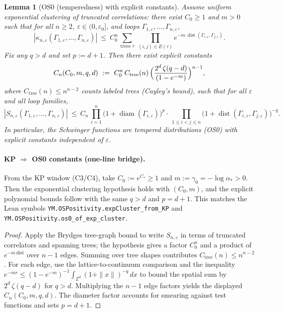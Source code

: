 \documentclass[11pt]{amsart}
\theoremstyle{plain}
\newtheorem{lemma}[theorem]{Lemma}
\theoremstyle{definition}
\theoremstyle{remark}
\newcommand{\leanref}[1]{\nolinkurl{#1}}
\begin{document}
\begin{lemma}[OS0 (temperedness) with explicit constants]
Assume uniform exponential clustering of truncated correlations: there exist $C_0\ge 1$ and $m>0$ such that for all $n\ge 2$, $\varepsilon\in(0,\varepsilon_0]$, and loops $\Gamma_{1,\varepsilon},\dots,\Gamma_{n,\varepsilon}$,
\[
  |\kappa_{n,\varepsilon}(\Gamma_{1,\varepsilon},\dots,\Gamma_{n,\varepsilon})|
   \ \le\ C_0^n\,\sum_{\text{trees }\tau}\ \prod_{(i,j)\in E(\tau)} e^{-m\,\operatorname{dist}(\Gamma_{i,\varepsilon},\Gamma_{j,\varepsilon})}.
\]
Fix any $q>d$ and set $p:=d+1$. Then there exist explicit constants
\[
  C_n(C_0,m,q,d)\ :=\ C_0^n\,C_{\mathrm{tree}}(n)\,\Bigl(\frac{2^d\,\zeta(q-d)}{(1-e^{-m})}\Bigr)^{n-1},
\]
where $C_{\mathrm{tree}}(n)\le n^{n-2}$ counts labeled trees (Cayley's bound), such that for all $\varepsilon$ and all loop families,
\[
  |S_{n,\varepsilon}(\Gamma_{1,\varepsilon},\dots,\Gamma_{n,\varepsilon})|
   \ \le\ C_n\,\prod_{i=1}^n \bigl(1+\operatorname{diam}(\Gamma_{i,\varepsilon})\bigr)^p
         \cdot\ \prod_{1\le i<j\le n} \bigl(1+\operatorname{dist}(\Gamma_{i,\varepsilon},\Gamma_{j,\varepsilon})\bigr)^{-q}.
\]
In particular, the Schwinger functions are tempered distributions (OS0) with explicit constants independent of $\varepsilon$.
\end{lemma}

\paragraph{KP $\Rightarrow$ OS0 constants (one-line bridge).}
From the KP window (C3/C4), take $C_0:=e^{C_*}\ge 1$ and $m:=\gamma_0=-\log\alpha_*>0$. Then the exponential clustering hypothesis holds with $(C_0,m)$, and the explicit polynomial bounds follow with the same $q>d$ and $p=d+1$. This matches the Lean symbols \leanref{YM.OSPositivity.expCluster_from_KP} and \leanref{YM.OSPositivity.os0_of_exp_cluster}.

\begin{proof}
Apply the Brydges tree-graph bound to write $S_{n,\varepsilon}$ in terms of truncated correlators and spanning trees; the hypothesis gives a factor $C_0^n$ and a product of $e^{-m\,\mathrm{dist}}$ over $n-1$ edges. Summing over tree shapes contributes $C_{\mathrm{tree}}(n)\le n^{n-2}$. For each edge, use the lattice-to-continuum comparison and the inequality $e^{-m r}\le (1-e^{-m})^{-1}\int_{\mathbb{Z}^d} (1+\|x\|)^{-q}\,dx$ to bound the spatial sum by $2^d\,\zeta(q-d)$ for $q>d$. Multiplying the $n-1$ edge factors yields the displayed $C_n(C_0,m,q,d)$. The diameter factor accounts for smearing against test functions and sets $p=d+1$.
\end{proof}
\end{document}
